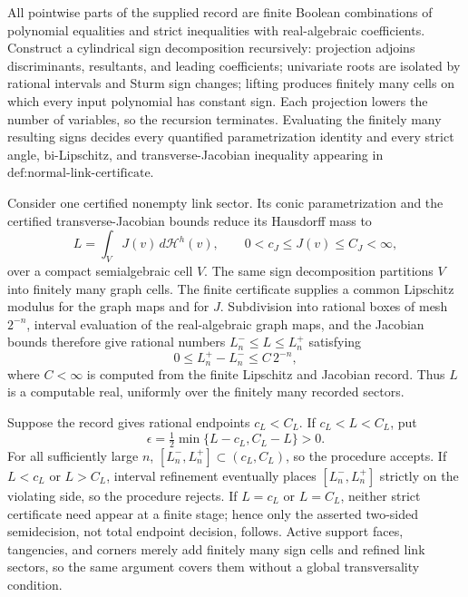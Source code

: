 All pointwise parts of the supplied record are finite Boolean combinations of polynomial equalities and strict inequalities with real-algebraic coefficients. Construct a cylindrical sign decomposition recursively: projection adjoins discriminants, resultants, and leading coefficients; univariate roots are isolated by rational intervals and Sturm sign changes; lifting produces finitely many cells on which every input polynomial has constant sign. Each projection lowers the number of variables, so the recursion terminates. Evaluating the finitely many resulting signs decides every quantified parametrization identity and every strict angle, bi-Lipschitz, and transverse-Jacobian inequality appearing in \(\text{def:normal-link-certificate}\).

Consider one certified nonempty link sector. Its conic parametrization and the certified transverse-Jacobian bounds reduce its Hausdorff mass to
\[
L=\int_V J(v)\,d\mathcal H^h(v),
\qquad 0<c_J\le J(v)\le C_J<\infty,
\]
over a compact semialgebraic cell \(V\). The same sign decomposition partitions \(V\) into finitely many graph cells. The finite certificate supplies a common Lipschitz modulus for the graph maps and for \(J\). Subdivision into rational boxes of mesh \(2^{-n}\), interval evaluation of the real-algebraic graph maps, and the Jacobian bounds therefore give rational numbers \(L_n^-\le L\le L_n^+\) satisfying
\[
0\le L_n^+-L_n^-\le C\,2^{-n},
\]
where \(C<\infty\) is computed from the finite Lipschitz and Jacobian record. Thus \(L\) is a computable real, uniformly over the finitely many recorded sectors.

Suppose the record gives rational endpoints \(c_L<C_L\). If \(c_L<L<C_L\), put
\[
\epsilon=\tfrac12\min\{L-c_L,C_L-L\}>0.
\]
For all sufficiently large \(n\), \([L_n^-,L_n^+]\subset(c_L,C_L)\), so the procedure accepts. If \(L<c_L\) or \(L>C_L\), interval refinement eventually places \([L_n^-,L_n^+]\) strictly on the violating side, so the procedure rejects. If \(L=c_L\) or \(L=C_L\), neither strict certificate need appear at a finite stage; hence only the asserted two-sided semidecision, not total endpoint decision, follows. Active support faces, tangencies, and corners merely add finitely many sign cells and refined link sectors, so the same argument covers them without a global transversality condition.